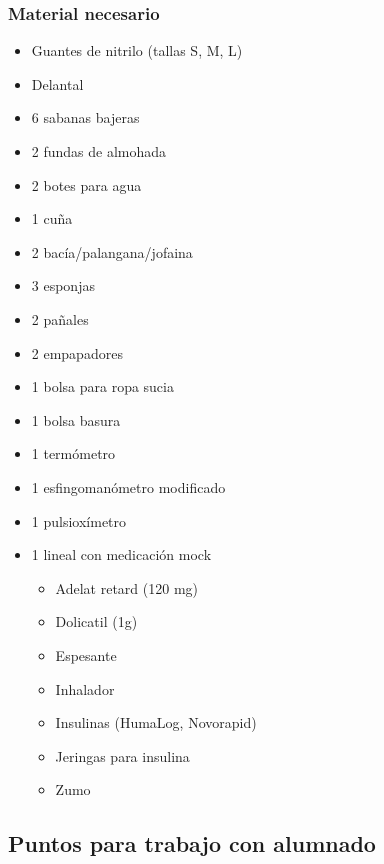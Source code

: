 \subsubsection{Material necesario}
\begin{multicols}{2}
    \begin{itemize}[topsep=0pt, partopsep=0pt,itemsep=0pt,parsep=0pt]
        \item Guantes de nitrilo (tallas S, M, L)
        \item Delantal
        \item 6 sabanas bajeras
        \item 2 fundas de almohada
        \item 2 botes para agua
        \item 1 cuña
        \item 2 bacía/palangana/jofaina
        \item 3 esponjas
        \item 2 pañales
        \item 2 empapadores
        \item 1 bolsa para ropa sucia
        \item 1 bolsa basura
        \item 1 termómetro
        \item 1 esfingomanómetro modificado
        \item 1 pulsioxímetro
        \item 1 lineal con medicación mock
        \begin{itemize}[topsep=0pt, partopsep=0pt,itemsep=0pt,parsep=0pt]
            \item Adelat retard (120 mg)
            \item Dolicatil (1g)
            \item Espesante
            \item Inhalador
            \item Insulinas (HumaLog, Novorapid)
            \item Jeringas para insulina
            \item Zumo
        \end{itemize}
    \end{itemize}
\end{multicols}

\subsection{Puntos para trabajo con alumnado}

